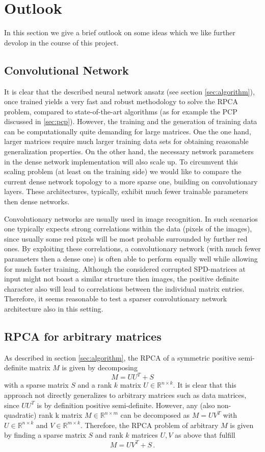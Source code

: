 \newpage
\section{Outlook}\label{sec:outlook}

In this section we give a brief outlook on some ideas which we like further devolop in the course of this project.


\subsection{Convolutional Network}
It is clear that the described neural network ansatz (see section \ref{sec:algorithm}), once trained yields a very fast and robust methodology to solve the RPCA problem, compared to state-of-the-art algorithms (as for example the PCP discussed in \ref{sec:pcp}). However, the training and the generation of training data can be computationally quite demanding for large matrices. One the one hand, larger matrices require much larger training data sets for obtaining reasonable generalization properties. On the other hand, the necessary network parameters in the dense network implementation will also scale up. To circumvent this scaling problem (at least on the training side) we would like to compare the current dense network topology to a more sparse one, building on convolutionary layers. These architectures, typically, exhibit much fewer trainable parameters then dense networks.

Convolutionary networks are usually used in image recognition. In such scenarios one typically expects strong correlations within the data (pixels of the images), since usually some red pixels will be most probable surrounded by further red ones. By exploiting these correlations, a convolutionary network (with much fewer parameters then a dense one) is often able to perform equally well while allowing for much faster training. Although the considered corrupted SPD-matrices at input might not boast a similar structure then images, the positive definite character also will lead to correlations between the individual matrix entries. Therefore, it seems reasonable to test a sparser convolutionary network architecture also in this setting.

\subsection{RPCA for arbitrary matrices}
As described in section \ref{sec:algorithm}, the RPCA of a symmetric positive semi-definite matrix $M$ is given by decomposing
\[
M = UU^T + S
\]
with a sparse matrix $S$ and a rank $k$ matrix $U\in\mathbb{R}^{n\times k}$. It is clear that this approach not directly generalizes to arbitrary matrices such as data matrices, since $UU^T$ is by definition positive semi-definite. However, any (also non-quadratic) rank k matrix $M\in\mathbb{R}^{n\times m}$ can be decomposed as $M = UV^T$ with $U\in\mathbb{R}^{n\times k}$ and $V\in\mathbb{R}^{m\times k}$. Therefore, the RPCA problem of arbitrary $M$ is given by finding a sparse matrix $S$ and rank $k$ matrices $U,V$ as above that fulfill
\[
M = UV^T + S \,.
\]

